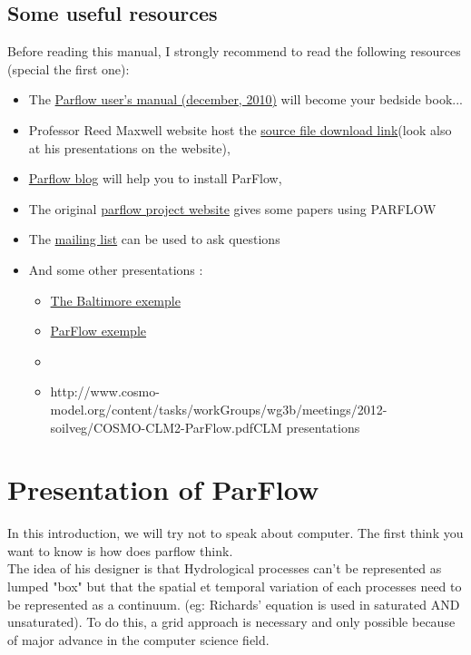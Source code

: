 \documentclass[11pt,a4paper]{report}
\begin{document}
\section{Some useful resources}
Before reading this manual, I strongly recommend to read the following resources (special the first one):
\begin{itemize}
\item The  \href{http://inside.mines.edu/~rmaxwell/parflow.manual.12-27-10.pdf}{Parflow user's manual (december, 2010)} will become your bedside book...
\item Professor Reed Maxwell website host the \href{http://inside.mines.edu/~rmaxwell/maxwell_software.shtml}{source file download link}(look also at his presentations on the website),
\item \href{http://parflow.blogspot.ca/}{Parflow blog} will help you to install ParFlow,
\item The original \href{http://computation.llnl.gov/casc/parflow/parflow_home.html}{parflow project website} gives some papers using PARFLOW
\item The \href{https://mailman.mines.edu/mailman/listinfo/parflow-users}{mailing list} can be used to ask questions 
\item And some other presentations :
\begin{itemize}
\item \href{http://www.umbc.edu/cuere/BaltimoreWTB/pdf/TR_2010_002.pdf}{The Baltimore exemple}
\item \href{https://www.google.ca/url?sa=t&rct=j&q=&esrc=s&source=web&cd=9&cad=rja&uact=8&ved=0CHUQFjAI&url=http%3A%2F%2Fcsdms.colorado.edu%2Fw%2Fimages%2FCyber_March_09_Maxwell.ppt&ei=owyIU63LJcjf8AGU34DQCQ&usg=AFQjCNH3lKFDUbs9GKHsIZyjGw3gIveTNg&sig2=qmeH_a8tHg33vPuFWiqNzw&bvm=bv.67720277,d.b2U} {ParFlow exemple}
\item \item {http://www.cosmo-model.org/content/tasks/workGroups/wg3b/meetings/2012-soilveg/COSMO-CLM2-ParFlow.pdf}{CLM presentations}
\end{itemize}
\end{itemize}

\chapter{Presentation of ParFlow}
In this introduction, we will try not to speak about computer. The first think you want to know is how does parflow think.\\
The idea of his designer is that Hydrological processes can't be represented as lumped "box" but that the spatial et temporal variation of each processes need to be represented as a continuum. (eg: Richards' equation is used in saturated AND unsaturated). To do this, a grid approach is necessary and only possible because of major advance in the computer science field. 
\end{document}
